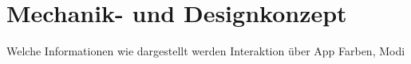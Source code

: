 \section{Mechanik- und Designkonzept} 
Welche Informationen wie dargestellt werden
Interaktion über App
Farben, Modi